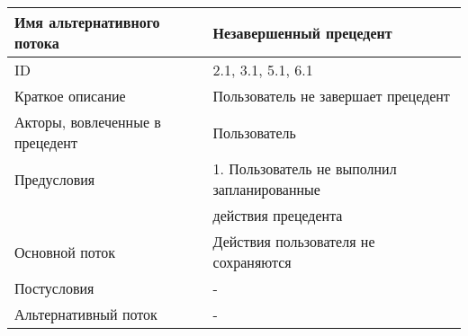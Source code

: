 \bigskip\noindent
\begin{tabular}{|l|l|}
    \hline Имя альтернативного потока      & Незавершенный прецедент \\
    \hline ID                              & 2.1, 3.1, 5.1, 6.1 \\
    \hline Краткое описание                & Пользователь не завершает прецедент \\
    \hline Акторы, вовлеченные в прецедент & Пользователь \\
    \hline Предусловия                     & 1. Пользователь не выполнил запланированные \\
                                           & действия прецедента \\
    \hline Основной поток                  & Действия пользователя не сохраняются \\
    \hline Постусловия                     & - \\
    \hline Альтернативный поток            & - \\
    \hline
\end{tabular}
